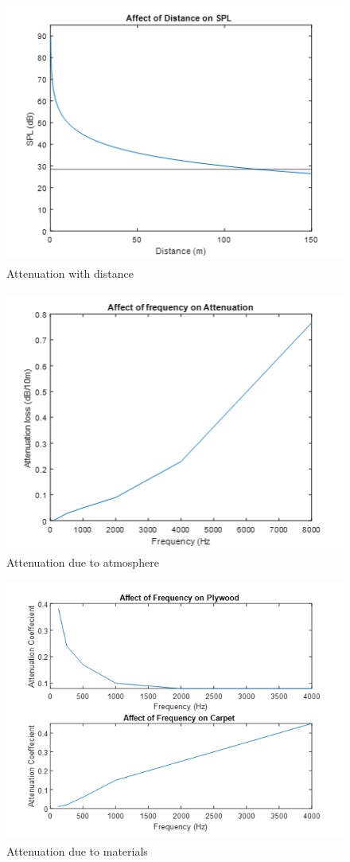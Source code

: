 \begin{figure}[H]
\centering
\noindent 
\includegraphics[width=11.47cm,height=8.6cm]{./images/sim1}
\caption{Attenuation with distance}
\label{fig:distAtt}
\end{figure}

\begin{figure}[H]
\centering
\noindent 
\includegraphics[width=11.47cm,height=8.6cm]{./images/sim2}
\caption{Attenuation due to atmosphere}
\label{fig:distAtt}
\end{figure}

\begin{figure}[H]
\centering
\noindent 
\includegraphics[width=11.47cm,height=8.6cm]{./images/sim3}
\caption{Attenuation due to materials}
\label{fig:distAtt}
\end{figure}